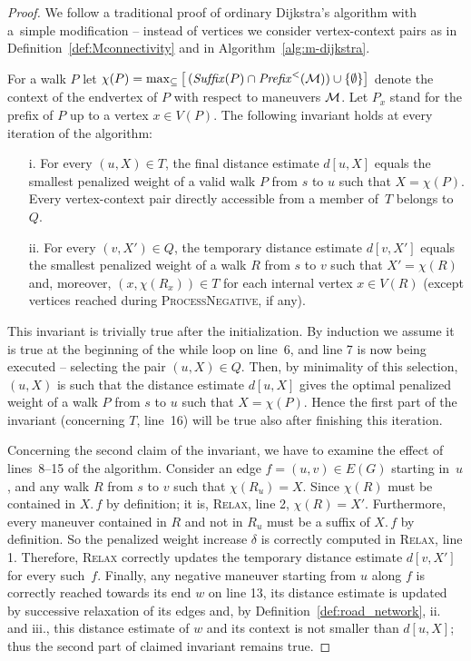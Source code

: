 \documentclass[envcountsect,envcountsame]{llncs}
\begin{document}
\begin{proof}
We follow a traditional proof of ordinary Dijkstra's algorithm with a~simple 
modification -- instead of vertices we consider vertex-context pairs as in 
Definition~\ref{def:Mconnectivity} and in Algorithm~\ref{alg:m-dijkstra}.

For a walk $P$ let $\chi(P)=\max_{\subseteq} \big[\,(\mathit{Suf\!fix}(P) \cap 
\mathit{Prefix}^<({\cal{M}})) \cup \{\emptyset\}\big]$ denote the context of 
the endvertex of $P$ with respect to maneuvers $\cal M$. Let $P_x$ stand for 
the prefix of $P$ up to a vertex $x\in V(P)$. The following invariant holds at 
every iteration of the algorithm:

\begin{itemize}
\item[i.] For every $(u,X)\in T$, the final distance estimate $d[u,X]$ equals 
  the smallest penalized weight of a valid walk $P$ from $s$ to $u$ such that
  $X=\chi(P)$. Every vertex-context pair directly accessible from a member
  of~$T$ belongs to $Q$.
  \medskip
\item[ii.] For every $(v,X')\in Q$, the temporary distance estimate 
  $d[v,X']$ equals the smallest penalized weight of a walk $R$ from 
  $s$ to $v$ such that $X'=\chi(R)$ and, moreover,
  $(x,\chi(R_x))\in T$ for each internal vertex $x\in V(R)$
  (except vertices reached during \textsc{ProcessNegative}, if any).
\end{itemize}

This invariant is trivially true after the initialization. By induction we 
assume it is true at the beginning of the while loop on line~6, and line 7 is 
now being executed -- selecting the pair $(u,X)\in Q$. Then, by minimality of 
this selection, $(u,X)$ is such that the distance estimate $d[u,X]$ gives the 
optimal penalized weight of a walk $P$ from $s$ to $u$ such that 
$X=\chi(P)$. Hence the first part of the invariant (concerning $T$, line~16)
will be true also after finishing this iteration.

Concerning the second claim of the invariant, we have to examine the effect
of lines~8--15 of the algorithm. Consider an edge $f=(u,v) \in E(G)$ starting 
in~$u$, and any walk $R$ from $s$ to $v$ such that $\chi(R_u)=X$. Since 
$\chi(R)$ must be contained in $X.\,f$ by definition; it is, \textsc{Relax}, 
line 2, $\chi(R)=X'$. Furthermore, every maneuver contained in $R$ and not 
in $R_u$ must be a suffix of $X.\,f$ by definition. So the penalized weight 
increase $\delta$ is correctly computed in \textsc{Relax}, line 1. Therefore, 
\textsc{Relax} correctly updates the temporary distance estimate $d[v,X']$ 
for every such~$f$. Finally, any negative maneuver starting from $u$ along 
$f$ is correctly reached towards its end $w$ on line 13, its distance estimate
is updated by successive relaxation of its edges and, by 
Definition~\ref{def:road_network}, ii. and iii., this distance estimate of $w$ and 
its context is not smaller than $d[u,X]$; thus the second part of claimed 
invariant remains true. 


\end{proof}
\end{document}
